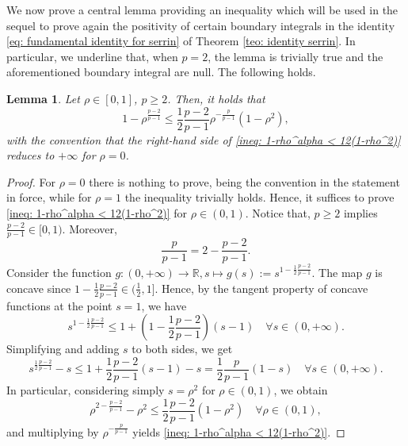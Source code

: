 \documentclass[10pt,a4paper]{amsart}
\numberwithin{equation}{section}
\newcommand{\R}{\mathbb{R}}
\newtheorem{lemma}[teo]{Lemma}
\begin{document}
    We now prove a central lemma providing an inequality which will be used in the sequel to prove again the positivity of certain boundary integrals in the identity \eqref{eq: fundamental identity for serrin} of Theorem \ref{teo: identity serrin}. In particular, we underline that, when $p=2$, the lemma is trivially true and the aforementioned boundary integral are null. The following holds.
    
    \begin{lemma}\label{lem:rho ineq}
        Let $\rho \in [0,1]$, $p \geq 2$. Then, it holds that
        \begin{equation}\label{ineq: 1-rho^alpha < 12(1-rho^2)}
            1-\rho^{\frac{p-2}{p-1}} \leq \frac{1}{2} \frac{p-2}{p-1} \rho^{-\frac{p}{p-1}} (1-\rho^2),
        \end{equation}
        with the convention that the right-hand side of \eqref{ineq: 1-rho^alpha < 12(1-rho^2)} reduces to  $+\infty$ for $\rho=0$.
    \end{lemma}

    \begin{proof}
        For $\rho=0$ there is nothing to prove, being the convention in the statement in force, while for $\rho=1$ the inequality trivially holds.
        Hence, it suffices to prove \eqref{ineq: 1-rho^alpha < 12(1-rho^2)} for $\rho \in (0,1)$. Notice that, $p\geq 2$ implies $\frac{p-2}{p-1} \in [0,1)$. Moreover,
        \begin{equation*}
            \frac{p}{p-1} = 2-\frac{p-2}{p-1}.
        \end{equation*}
        Consider the function $g: (0,+\infty) \longrightarrow \R, s \mapsto g(s) := s^{1- \frac{1}{2}\frac{p-2}{p-1}}$. The map $g$ is concave since $1- \frac{1}{2}\frac{p-2}{p-1} \in (\frac{1}{2},1]$. Hence, by the tangent property of concave functions at the point $s=1$, we have
        \begin{equation*}
            s^{1- \frac{1}{2}\frac{p-2}{p-1}} \leq 1 + \left(1- \frac{1}{2}\frac{p-2}{p-1} \right)(s-1) \quad \forall s \in (0,+\infty).
        \end{equation*}
        Simplifying and adding $s$ to both sides, we get
        \begin{equation*}
            s^{\frac{1}{2}\frac{p-2}{p-1}} - s \leq 1 + \frac{1}{2}\frac{p-2}{p-1}(s-1) - s = \frac{1}{2}\frac{p}{p-1}(1-s) \quad \forall s \in (0,+\infty).
        \end{equation*}
        In particular, considering simply $s = \rho^2$ for $\rho \in (0,1)$, we obtain
        \begin{equation*}
            \rho^{2 - \frac{p-2}{p-1}} - \rho^2 \leq \frac{1}{2}\frac{p-2}{p-1}(1-\rho^2) \quad \forall \rho \in (0,1),
        \end{equation*}
        and multiplying by $\rho^{-\frac{p}{p-1}}$ yields \eqref{ineq: 1-rho^alpha < 12(1-rho^2)}.
    \end{proof}
\end{document}
